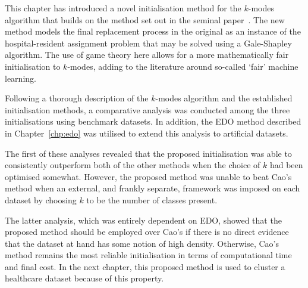 This chapter has introduced a novel initialisation method for the \(k\)-modes
algorithm that builds on the method set out in the seminal
paper~\cite{Huang1998}. The new method models the final replacement process in
the original as an instance of the hospital-resident assignment problem that may
be solved using a Gale-Shapley algorithm. The use of game theory here allows for
a more mathematically fair initialisation to \(k\)-modes, adding to the
literature around so-called `fair' machine learning.

Following a thorough description of the \(k\)-modes algorithm and the
established initialisation methods, a comparative analysis was conducted among
the three initialisations using benchmark datasets. In addition, the EDO method
described in Chapter~\ref{chp:edo} was utilised to extend this analysis to
artificial datasets.

The first of these analyses revealed that the proposed initialisation was able
to consistently outperform both of the other methods when the choice of \(k\)
had been optimised somewhat. However, the proposed method was unable to beat
Cao's method when an external, and frankly separate, framework was imposed on
each dataset by choosing \(k\) to be the number of classes present.

The latter analysis, which was entirely dependent on EDO, showed that the
proposed method should be employed over Cao's if there is no direct evidence
that the dataset at hand has some notion of high density. Otherwise, Cao's
method remains the most reliable initialisation in terms of computational time
and final cost. In the next chapter, this proposed method is used to cluster a
healthcare dataset because of this property.
